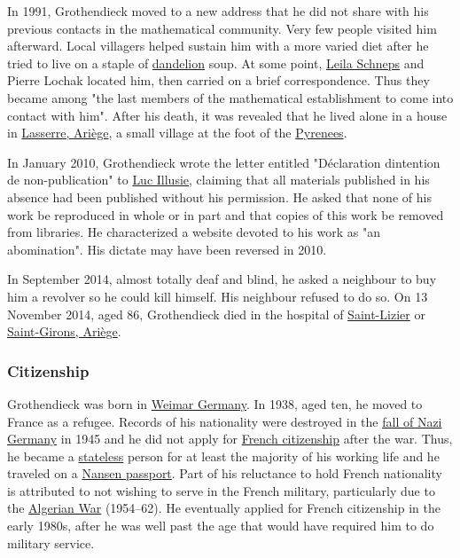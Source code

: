 In 1991, Grothendieck moved to a new address that he did not share with his previous contacts in the mathematical community. Very few people visited him afterward. Local villagers helped sustain him with a more varied diet after he tried to live on a staple of \href{https://en.wikipedia.org/wiki/Taraxacum}{dandelion} soup. At some point, \href{https://en.wikipedia.org/wiki/Leila_Schneps}{Leila Schneps} and Pierre Lochak located him, then carried on a brief correspondence. Thus they became among "the last members of the mathematical establishment to come into contact with him". After his death, it was revealed that he lived alone in a house in \href{https://en.wikipedia.org/wiki/Lasserre,_Ariège}{Lasserre, Ariège}, a small village at the foot of the \href{https://en.wikipedia.org/wiki/Pyrenees}{Pyrenees}.

In January 2010, Grothendieck wrote the letter entitled "Déclaration d\textquotesingle intention de non-publication" to \href{https://en.wikipedia.org/wiki/Luc_Illusie}{Luc Illusie}, claiming that all materials published in his absence had been published without his permission. He asked that none of his work be reproduced in whole or in part and that copies of this work be removed from libraries. He characterized a website devoted to his work as "an abomination". His dictate may have been reversed in 2010.

In September 2014, almost totally deaf and blind, he asked a neighbour to buy him a revolver so he could kill himself. His neighbour refused to do so. On 13 November 2014, aged 86, Grothendieck died in the hospital of \href{https://en.wikipedia.org/wiki/Saint-Lizier}{Saint-Lizier} or \href{https://en.wikipedia.org/wiki/Saint-Girons,_Ariège}{Saint-Girons, Ariège}.


\subsubsection{Citizenship}\label{Citizenship}

Grothendieck was born in \href{https://en.wikipedia.org/wiki/Weimar_Republic}{Weimar Germany}. In 1938, aged ten, he moved to France as a refugee. Records of his nationality were destroyed in the \href{https://en.wikipedia.org/wiki/Third_Reich}{fall of Nazi Germany} in 1945 and he did not apply for \href{https://en.wikipedia.org/wiki/French_citizenship}{French citizenship} after the war. Thus, he became a \href{https://en.wikipedia.org/wiki/Statelessness}{stateless} person for at least the majority of his working life and he traveled on a \href{https://en.wikipedia.org/wiki/Nansen_passport}{Nansen passport}. Part of his reluctance to hold French nationality is attributed to not wishing to serve in the French military, particularly due to the \href{https://en.wikipedia.org/wiki/Algerian_War}{Algerian War} (1954--62). He eventually applied for French citizenship in the early 1980s, after he was well past the age that would have required him to do military service.


